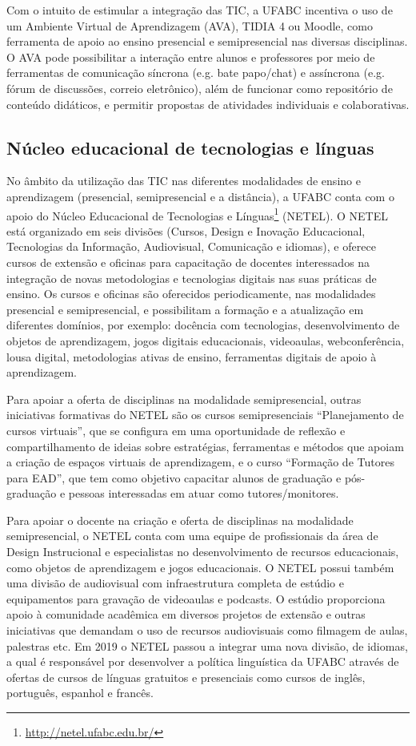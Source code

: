 Com o intuito de estimular a integração das TIC, a UFABC incentiva o uso de um
Ambiente Virtual de Aprendizagem (AVA), TIDIA 4 ou Moodle, como ferramenta de
apoio ao ensino presencial e semipresencial nas diversas disciplinas. 
O AVA pode possibilitar a interação entre alunos e professores por meio de
ferramentas de comunicação síncrona (e.g. bate papo/chat) e assíncrona (e.g.
fórum de discussões, correio eletrônico), além de funcionar como repositório de
conteúdo didáticos, e permitir propostas de atividades individuais e
colaborativas.

\subsection{Núcleo educacional de tecnologias e línguas}

No âmbito da utilização das TIC nas diferentes modalidades de ensino e
aprendizagem (presencial, semipresencial e a distância), a UFABC conta com o
apoio do Núcleo Educacional de Tecnologias e
Línguas\footnote{\url{http://netel.ufabc.edu.br/}} (NETEL).
O NETEL está organizado em seis divisões (Cursos, Design e Inovação
Educacional, Tecnologias da Informação, Audiovisual, Comunicação e idiomas), e
oferece cursos de extensão e oficinas para capacitação de docentes interessados
na integração de novas metodologias e tecnologias digitais nas suas práticas de
ensino. 
Os cursos e oficinas são oferecidos periodicamente, nas modalidades presencial
e semipresencial, e possibilitam a formação e a atualização em diferentes
domínios, por exemplo: docência com tecnologias, desenvolvimento de objetos de
aprendizagem, jogos digitais educacionais, videoaulas, webconferência, lousa
digital, metodologias ativas de ensino, ferramentas digitais de apoio à
aprendizagem. 

Para apoiar a oferta de disciplinas na modalidade semipresencial, outras
iniciativas formativas do NETEL são os cursos semipresenciais ``Planejamento de
cursos virtuais'', que se configura em uma oportunidade de reflexão e
compartilhamento de ideias sobre estratégias, ferramentas e métodos que apoiam
a criação de espaços virtuais de aprendizagem, e o curso ``Formação de Tutores
para EAD'', que tem como objetivo capacitar alunos de graduação e pós-graduação
e pessoas interessadas em atuar como tutores/monitores. 

Para apoiar o docente na criação e oferta de disciplinas na modalidade
semipresencial, o NETEL conta com uma equipe de profissionais da área de Design
Instrucional e especialistas no desenvolvimento de recursos educacionais, como
objetos de aprendizagem e jogos educacionais. 
O NETEL possui também uma divisão de audiovisual com infraestrutura completa de
estúdio e equipamentos para gravação de videoaulas e podcasts. 
O estúdio proporciona apoio à comunidade acadêmica em diversos projetos de
extensão e outras iniciativas que demandam o uso de recursos audiovisuais como
filmagem de aulas, palestras etc. 
Em 2019 o NETEL passou a integrar uma nova divisão, de idiomas, a qual é
responsável por desenvolver a política linguística da UFABC através de ofertas
de cursos de línguas gratuitos e presenciais como cursos de inglês, português,
espanhol e francês.

